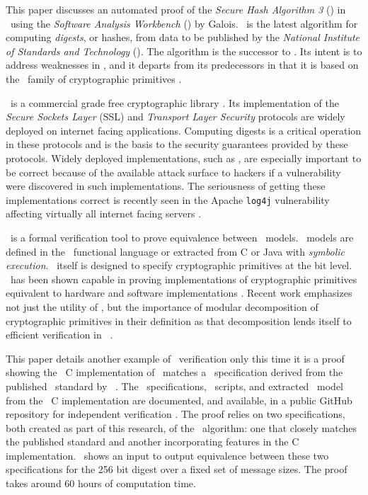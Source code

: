 This paper discusses an automated proof of the \emph{Secure Hash Algorithm 3} (\shaThree) in \openssl\ using the \emph{Software Analysis Workbench} (\saw) by Galois.
\shaThree\ is the latest algorithm for computing \emph{digests}, or hashes, from data to be published by the \emph{National Institute of Standards and Technology} (\nist).
The algorithm is the successor to \shaTwo.
Its intent is to address weaknesses in \shaTwo, and it departs from its predecessors in that it is based on the \keccak\ family of cryptographic primitives \cite{fips202}.

\openssl\ is a commercial grade free cryptographic library \cite{openssl}.
Its implementation of the \emph{Secure Sockets Layer} (SSL) and \emph{Transport Layer Security} protocols are widely deployed on internet facing applications.
Computing digests is a critical operation in these protocols and is the basis to the security guarantees provided by these protocols.
Widely deployed implementations, such as \openssl, are especially important to be correct because of the available attack surface to hackers if a vulnerability were discovered in such implementations.
The seriousness of getting these implementations correct is recently seen in the Apache \texttt{log4j} vulnerability affecting virtually all internet facing servers \cite{log4j}.

\saw\ is a formal verification tool to prove equivalence between \sawcore\ models. \sawcore\ models are defined in the \cryptol\ functional language or extracted from C or Java with \emph{symbolic execution}.
\cryptol\ itself is designed to specify cryptographic primitives at the bit level.
\saw\ has been shown capable in proving implementations of cryptographic primitives equivalent to hardware and software implementations \cite{crypt-hi,hard-soft,design-verif}.
Recent work emphasizes not just the utility of \saw, but the importance of modular decomposition of cryptographic primitives in their definition as that decomposition lends itself to efficient verification in \saw\ \cite{nfm-us}. 

This paper details another example of \saw\ verification only this time it is a proof showing the \openssl\ C implementation of \shaThree\ matches a \cryptol\ specification derived from the published \fips\ standard by \nist\ \cite{fips202}.
The \cryptol\ specifications, \saw\ scripts, and extracted \sawcore\ model from the \openssl\ C implementation are documented, and available, in a public GitHub repository for independent verification \cite{sha3proof}.
The proof relies on two specifications, both created as part of this research, of the \shaThree\ algorithm: one that closely matches the published standard and another incorporating features in the C implementation.
\saw\ shows an input to output equivalence between these two specifications for the 256 bit digest over a fixed set of message sizes. The proof takes around 60 hours of computation time.

